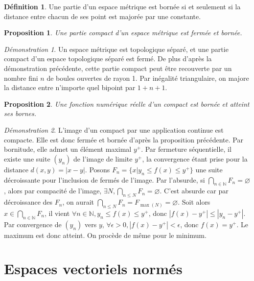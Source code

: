 \documentclass[a4paper, 11pt, french]{book}
\theoremstyle{plain} %
\newtheorem{proposition}{Proposition}
\theoremstyle{definition} %
\newtheorem{definition}{Définition}
\theoremstyle{remark} %
\newtheorem*{demonstration}{Démonstration}
\newcommand{\1}{\mathds{1}}
\newcommand\vide{\varnothing}
\newcommand{\infegal}{\leqslant}
\newcommand{\N}{\mathbb{N}}
\begin{document}
\begin{definition}
	Une partie d'un espace métrique est bornée si et seulement si la distance entre chacun de ses point est majorée par une constante.
\end{definition}

\begin{proposition}
	Une partie compact d'un espace métrique est fermée et bornée.
\end{proposition}

\begin{demonstration}
	Un espace métrique est topologique séparé, et une partie compact d'un espace topologique séparé est fermé.
	De plus d'après la démonstration précédente, cette partie compact peut être recouverte par un nombre fini $n$ de boules ouvertes de rayon 1.
	Par inégalité triangulaire, on majore la distance entre n'importe quel bipoint par $1+n+1$.
\end{demonstration}

\begin{proposition}
	Une fonction numérique réelle d'un compact est bornée et atteint ses bornes.
\end{proposition}

\begin{demonstration}
	L’image d'un compact par une application continue est compacte.
	Elle est donc fermée et bornée d'après la proposition précédente.
	Par bornitude, elle admet un élément maximal $y^+$.
	Par fermeture séquentielle, il existe une suite $(y_n)$ de l'image de limite $y^+$, la convergence étant prise pour la distance $d(x, y)=|x-y|$.
	Posons $F_n=\{x|y_n\infegal f(x)\infegal y^+\}$ une suite décroissante pour l'inclusion de fermés de l'image.
	Par l'absurde, si $\bigcap_{n\in\N}F_n=\vide$, alors par compacité de l'image, $\exists N, \bigcap_{n\infegal N}F_n=\vide$.
	C'est absurde car par décroissance des $F_n$, on aurait $\bigcap_{n\infegal N}F_n=F_{\max(N)}=\vide$.
	Soit alors $x\in\bigcap_{n\in\N}F_n$, il vient $\forall n\in\N, y_n\infegal f(x)\infegal y^+$, donc $|f(x)-y^+| \infegal |y_n-y^+|$.
	Par convergence de $(y_n)$ vers $y$, $\forall\epsilon>0, |f(x)-y^+|<\epsilon$, donc $f(x)=y^+$.
	Le maximum est donc atteint.
	On procède de même pour le minimum.
\end{demonstration}

\chapter{Espaces vectoriels normés}
\end{document}
